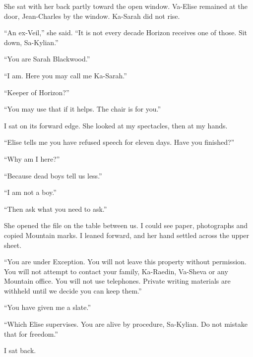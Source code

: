 She sat with her back partly toward the open window. Va-Elise remained at the door, Jean-Charles by the window. Ka-Sarah did not rise.\par

``An ex-Veil,'' she said. ``It is not every decade Horizon receives one of those. Sit down, Sa-Kylian.''\par

``You are Sarah Blackwood.''\par

``I am. Here you may call me Ka-Sarah.''\par

``Keeper of Horizon?''\par

``You may use that if it helps. The chair is for you.''\par

I sat on its forward edge. She looked at my spectacles, then at my hands.\par

``Elise tells me you have refused speech for eleven days. Have you finished?''\par

``Why am I here?''\par

``Because dead boys tell us less.''\par

``I am not a boy.''\par

``Then ask what you need to ask.''\par

She opened the file on the table between us. I could see paper, photographs and copied Mountain marks. I leaned forward, and her hand settled across the upper sheet.\par

``You are under Exception. You will not leave this property without permission. You will not attempt to contact your family, Ka-Raedin, Va-Sheva or any Mountain office. You will not use telephones. Private writing materials are withheld until we decide you can keep them.''\par

``You have given me a slate.''\par

``Which Elise supervises. You are alive by procedure, Sa-Kylian. Do not mistake that for freedom.''\par

I sat back.\par

